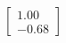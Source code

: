 \documentclass[preview]{standalone}
\begin{document}
\begin{align*}
\begin{bmatrix} 1.00 \\ -0.68 \end{bmatrix}
\end{align*}
\end{document}
